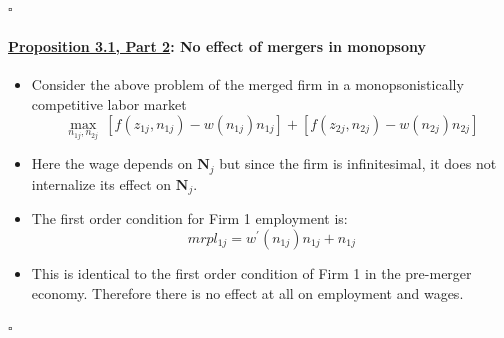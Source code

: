 \documentclass[12pt]{article}
\theoremstyle{prop}
\begin{document}
 \begin{flushright}
      $\square$
 \end{flushright}

\bigskip

\paragraph{\underline{Proposition 3.1, Part 2}: No effect of mergers in monopsony }
\begin{itemize}
	\item Consider the above problem of the merged firm in a monopsonistically
	competitive labor market
	\[
	\max_{n_{1j},n_{2j}}\:\left[f\left(z_{1j},n_{1j}\right)-w\left(n_{1j}\right)n_{1j}\right]+\left[f\left(z_{2j},n_{2j}\right)-w\left(n_{2j}\right)n_{2j}\right]
	\]
	\item Here the wage depends on $\mathbf{N}_{j}$ but since the firm
	is infinitesimal, it does not internalize its effect on $\mathbf{N}_{j}$.
	\item The first order condition for Firm 1 employment is:
	\[
	mrpl_{1j}=w^{\prime}\left(n_{1j}\right)n_{1j}+n_{1j}
	\]
	\item This is identical to the first order condition of Firm 1 in the pre-merger
	economy. Therefore there is no effect at all on employment and wages.
\end{itemize}
 \begin{flushright}
      $\square$
 \end{flushright}
\bigskip
\end{document}
